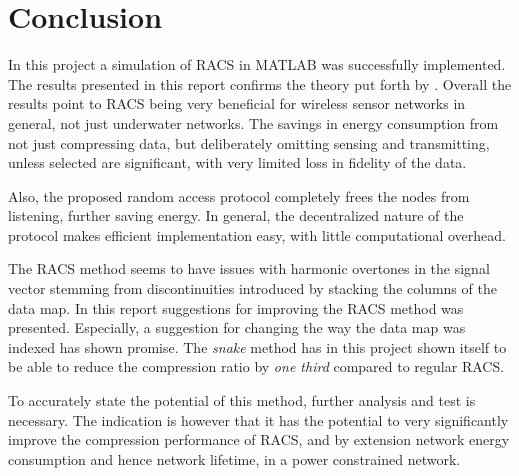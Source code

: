 \documentclass[Main]{subfiles}
\begin{document}
	\section{Conclusion} %
	\label{sec:conclusion}

		In this project a simulation of RACS in MATLAB was successfully implemented.
		The results presented in this report confirms the theory put forth by \cite{Fazel2011}.
		Overall the results point to RACS being very beneficial for wireless sensor networks in general, not just underwater networks.
		The savings in energy consumption from not just compressing data, but deliberately omitting sensing and transmitting, unless selected are significant, with very limited loss in fidelity of the data.
		
		Also, the proposed random access protocol completely frees the nodes from listening, further saving energy.
		In general, the decentralized nature of the protocol makes efficient implementation easy, with little computational overhead.

		The RACS method seems to have issues with harmonic overtones in the signal vector stemming from discontinuities introduced by stacking the columns of the data map.
		In this report suggestions for improving the RACS method was presented.
		Especially, a suggestion for changing the way the data map was indexed has shown promise.
		The \emph{snake} method has in this project shown itself to be able to reduce the compression ratio by \emph{one third} compared to regular RACS.
		
		To accurately state the potential of this method, further analysis and test is necessary.
		The indication is however that it has the potential to very significantly improve the compression performance of RACS, and by extension network energy consumption and hence network lifetime, in a power constrained network.

				
\end{document}
